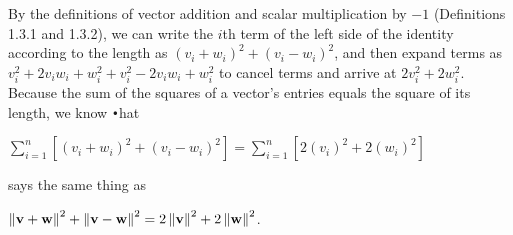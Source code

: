 \begin{solution}
\begin{enumerate}
\begin{answer}
   \vspace{\baselineskip}
   By the definitions of vector addition and scalar multiplication by $-1$ (Definitions 1.3.1 and 1.3.2), we can write the $i$th term of the left side of the identity according to the length as $(v_i + w_i)^2 + (v_i - w_i)^2$, and then expand terms as $v_i^2 +2v_iw_i +w_i^2 + v_i^2 - 2v_iw_i + w_i^2$  to cancel terms and arrive at $2v_i^2 + 2w_i^2$. Because the sum of the squares of a vector's entries equals the square of its length, we know \texttt{•}hat

$\sum_{i=1}^{n} [(v_i + w_i)^2 + (v_i - w_i)^2] = \sum_{i=1}^{n} [2(v_i)^2 + 2(w_i)^2]$

says the same thing as

$\left\lVert \mathbf{v} + \mathbf{w} \right\rVert^2 + \left\lVert \mathbf{v} - \mathbf{w} \right\rVert^2 = 2\left\lVert \mathbf{v} \right\rVert^2 + 2\left\lVert \mathbf{w} \right\rVert^2$.
   
    
  \end{answer}
  
\end{enumerate}
\end{solution}

